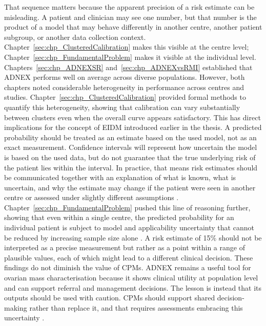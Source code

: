 That sequence matters because the apparent precision of a risk estimate can be misleading. A patient and clinician may see one number, but that number is the product of a model that may behave differently in another centre, another patient subgroup, or another data collection context. Chapter~\ref{sec:chp_ClusteredCalibration} makes this visible at the centre level; Chapter~\ref{sec:chp_FundamentalProblem} makes it visible at the individual level. 
Chapters~\ref{sec:chp_ADNEXSR} and~\ref{sec:chp_ADNEXvsRMI} established that \gls{ADNEX} performs well on average across diverse populations. However, both chapters noted considerable heterogeneity in performance across centres and studies. Chapter~\ref{sec:chp_ClusteredCalibration} provided formal methods to quantify this heterogeneity, showing that calibration can vary substantially between clusters even when the overall curve appears satisfactory. 
This has direct implications for the concept of \gls{EIDM} introduced earlier in the thesis. A predicted probability should be treated as an estimate based on the used model, not as an exact measurement. Confidence intervals will represent how uncertain the model is based on the used data, but do not guarantee that the true underlying risk of the patient lies within the interval. In practice, that means risk estimates should be communicated together with an explanation of what is known, what is uncertain, and why the estimate may change if the patient were seen in another centre or assessed under slightly different assumptions \cite{pateUncertaintyUsingRisk2019, rileyUncertaintyRiskEstimates2025, aldermanTacklingAlgorithmicBias2025, ganapathiTacklingBiasAI2022}.
Chapter~\ref{sec:chp_FundamentalProblem} pushed this line of reasoning further, showing that even within a single centre, the predicted probability for an individual patient is subject to model and applicability uncertainty that cannot be reduced by increasing sample size alone \cite{pateUncertaintyUsingRisk2019, rileyUncertaintyRiskEstimates2025}. A risk estimate of 15\% should not be interpreted as a precise measurement but rather as a point within a range of plausible values, each of which might lead to a different clinical decision.
These findings do not diminish the value of \glspl{CPM}. \gls{ADNEX} remains a useful tool for ovarian mass characterisation because it shows clinical utility at population level and can support referral and management decisions. The lesson is instead that its outputs should be used with caution. \glspl{CPM} should support shared decision-making rather than replace it, and that requires assessments embracing this uncertainty \cite{moonsCriticalAppraisalData2014, steyerbergClinicalPredictionModels2009}.

